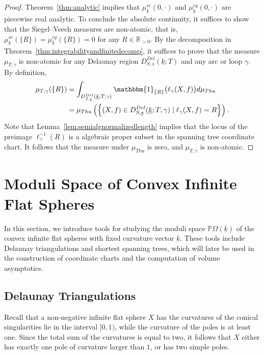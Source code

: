 \documentclass{compositio}
\numberwithin{equation}{section}
\numberwithin{figure}{section}
\theoremstyle{definition}
\theoremstyle{plain}
\begin{document}
{\begin{proof}
    Theorem~\ref{thm:analytic} implies that $\mu^{sc}_{\underline{k}}(0,\cdot)$ and $\mu^{cg}_{\underline{k}}(0,\cdot)$ are piecewise real analytic. To conclude the absolute continuity, it suffices to show that the Siegel--Veech measures are non-atomic, that is, $\mu^{sc}_{\underline k}(\{R\}) = \mu^{cg}_{\underline k}(\{R\}) = 0$ for any $R\in \mathbb R_{>0}$. By the decomposition in Theorem~\ref{thm:integrabilityandfinitedecomp}, it suffices to prove that the measure $\mu_{T,\gamma}$ is non-atomic for any Delaunay region $D_{S,\underline{s}}^{Del}(\underline{k};T)$ and any arc or loop $\gamma$. By definition,
    \begin{align*}
        \mu_{T,\gamma}(\{R\}) &= \int_{D_{S,\underline{s}}^{Del}(\underline{k};T, \gamma)}
         \mathbbm{1}_{\{R\}}\big(\ell_{\gamma}(X,f)\big)d\mu_{Thu}\\
         &= \mu_{Thu}\left(\left\{(X, f)\in D_{S,\underline{s}}^{Del}(\underline{k};T, \gamma) \mid \ell_{\gamma}(X,f) = R \right\}\right).
    \end{align*}
    Note that Lemma~\ref{lem:semialgnormalizedlength} implies that the locus of the preimage $\ell^{-1}_{\gamma}(R)$ is a algebraic proper subset in the spanning tree coordinate chart. It follows that the measure under $\mu_{Thu}$ is zero, and $\mu_{T,\gamma}$ is non-atomic.
\end{proof}


\section{Moduli Space of Convex Infinite Flat Spheres}\label{bigsec:convexinfinite}

In this section, we introduce tools for studying the moduli space $\mathbb{P}\Omega(\underline{k})$ of the convex infinite flat spheres with fixed curvature vector $\underline{k}$. These tools include Delaunay triangulations and shortest spanning trees, which will later be used in the construction of coordinate charts and the computation of volume asymptotics.

\subsection{Delaunay Triangulations}
Recall that a non-negative infinite flat sphere $X$ has the curvatures of the conical singularities lie in the interval $[0,1)$, while the curvature of the poles is at least one. Since the total sum of the curvatures is equal to two, it follows that $X$ either has exactly one pole of curvature larger than $1$, or has two simple poles.

}
\end{document}
